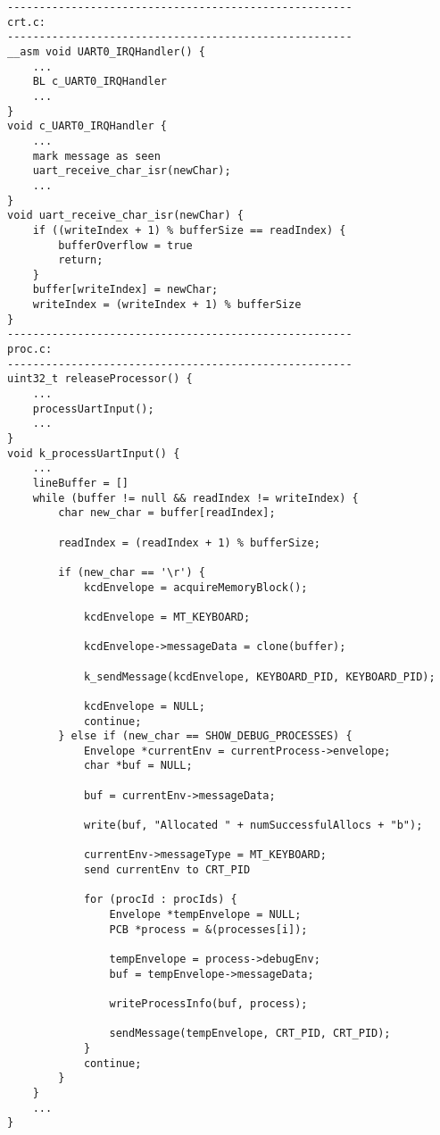 \documentclass[12pt]{report}
\begin{document}
{
\label{code:uart_input}
\begin{lstlisting}
------------------------------------------------------
crt.c:
------------------------------------------------------
__asm void UART0_IRQHandler() {
    ...
    BL c_UART0_IRQHandler
    ...
}
void c_UART0_IRQHandler {
    ...
    mark message as seen
    uart_receive_char_isr(newChar);
    ...
}
void uart_receive_char_isr(newChar) {
    if ((writeIndex + 1) % bufferSize == readIndex) {
        bufferOverflow = true
        return;
    }
    buffer[writeIndex] = newChar;
    writeIndex = (writeIndex + 1) % bufferSize
}
------------------------------------------------------
proc.c:
------------------------------------------------------
uint32_t releaseProcessor() {
    ...
    processUartInput();
    ...
}
void k_processUartInput() {
    ...
    lineBuffer = []
    while (buffer != null && readIndex != writeIndex) {
        char new_char = buffer[readIndex];

        readIndex = (readIndex + 1) % bufferSize;

        if (new_char == '\r') {
            kcdEnvelope = acquireMemoryBlock();

            kcdEnvelope = MT_KEYBOARD;

            kcdEnvelope->messageData = clone(buffer);

            k_sendMessage(kcdEnvelope, KEYBOARD_PID, KEYBOARD_PID);

            kcdEnvelope = NULL;
            continue;
        } else if (new_char == SHOW_DEBUG_PROCESSES) {
            Envelope *currentEnv = currentProcess->envelope;
            char *buf = NULL;

            buf = currentEnv->messageData;

            write(buf, "Allocated " + numSuccessfulAllocs + "b");

            currentEnv->messageType = MT_KEYBOARD;
            send currentEnv to CRT_PID

            for (procId : procIds) {
                Envelope *tempEnvelope = NULL;
                PCB *process = &(processes[i]);

                tempEnvelope = process->debugEnv;
                buf = tempEnvelope->messageData;

                writeProcessInfo(buf, process);

                sendMessage(tempEnvelope, CRT_PID, CRT_PID);
            }
            continue;
        }
    }
    ...
}
\end{lstlisting}
}
\end{document}
